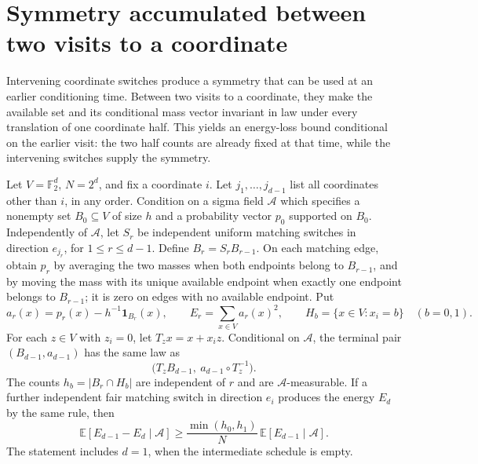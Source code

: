 \section{Symmetry accumulated between two visits to a coordinate}
\label{shear:sec:delayed-symmetry}

Intervening coordinate switches produce a symmetry that can be used at
an earlier conditioning time. Between two visits to a coordinate, they
make the available set and its conditional mass vector invariant in law
under every translation of one coordinate half. This yields an energy-loss
bound conditional on the earlier visit: the two half counts are already
fixed at that time, while the intervening switches supply the symmetry.

\begin{lemma}
\label{shear:lem:delayed-symmetry}
Let $V=\mathbb F_2^d$, $N=2^d$, and fix a coordinate $i$. Let
$j_1,\ldots,j_{d-1}$ list all coordinates other than $i$, in any order.
Condition on a sigma field $\mathcal A$ which specifies a nonempty set
$B_0\subseteq V$ of size $h$ and a probability vector $p_0$ supported on
$B_0$. Independently of $\mathcal A$, let $S_r$ be independent uniform
matching switches in direction $e_{j_r}$, for $1\le r\le d-1$.
Define $B_r=S_rB_{r-1}$. On each matching edge, obtain $p_r$ by averaging
the two masses when both endpoints belong to $B_{r-1}$, and by moving
the mass with its unique available endpoint when exactly one endpoint
belongs to $B_{r-1}$; it is zero on edges with no available endpoint.
Put
\[
 a_r(x)=p_r(x)-h^{-1}\mathbf1_{B_r}(x),\qquad
 E_r=\sum_{x\in V}a_r(x)^2,
 \qquad H_b=\{x\in V:x_i=b\}\quad(b=0,1).
\]
For each $z\in V$ with $z_i=0$, let $T_zx=x+x_i z$. Conditional on
$\mathcal A$, the terminal pair $(B_{d-1},a_{d-1})$ has the same law as
\begin{equation}
 \bigl(T_zB_{d-1},\ a_{d-1}\circ T_z^{-1}\bigr).
 \label{shear:eq:delayed-symmetry-invariance}
\end{equation}
The counts $h_b=|B_r\cap H_b|$ are independent of $r$ and are
$\mathcal A$-measurable. If a further independent fair matching switch
in direction $e_i$ produces the energy $E_d$ by the same rule, then
\begin{equation}
 \mathbb E[E_{d-1}-E_d\mid\mathcal A]
 \ge\frac{\min(h_0,h_1)}N\,
             \mathbb E[E_{d-1}\mid\mathcal A].
 \label{shear:eq:delayed-symmetry-loss}
\end{equation}
The statement includes $d=1$, when the intermediate schedule is empty.
\end{lemma}


